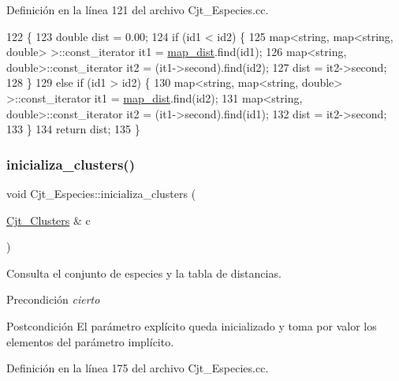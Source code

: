 Definición en la línea 121 del archivo Cjt\+\_\+\+Especies.\+cc.


\begin{DoxyCode}
122 \{
123     \textcolor{keywordtype}{double} dist = 0.00;
124     \textcolor{keywordflow}{if} (id1 < id2) \{
125         map<string, map<string, double> >::const\_iterator it1 = \hyperlink{class_cjt___especies_a9b104014aea0c1472ba4e7d7fc785e9a}{map\_dist}.find(id1);
126         map<string, double>::const\_iterator it2 =  (it1->second).find(id2);
127         dist = it2->second;
128     \}
129     \textcolor{keywordflow}{else} \textcolor{keywordflow}{if} (id1 > id2) \{
130         map<string, map<string, double> >::const\_iterator it1 = \hyperlink{class_cjt___especies_a9b104014aea0c1472ba4e7d7fc785e9a}{map\_dist}.find(id2);
131         map<string, double>::const\_iterator it2 =  (it1->second).find(id1);
132         dist = it2->second;
133     \}
134     \textcolor{keywordflow}{return} dist;
135 \}  
\end{DoxyCode}
\mbox{\label{class_cjt___especies_ae599e4e30a1d77e435395b796f821e06}} 
\subsubsection{\texorpdfstring{inicializa\+\_\+clusters()}{inicializa\_clusters()}}
{\footnotesize\ttfamily void Cjt\+\_\+\+Especies\+::inicializa\+\_\+clusters (\begin{DoxyParamCaption}\item[{\hyperlink{class_cjt___clusters}{Cjt\+\_\+\+Clusters} \&}]{c }\end{DoxyParamCaption})}



Consulta el conjunto de especies y la tabla de distancias. 

\begin{DoxyPrecond}{Precondición}
{\itshape cierto} 
\end{DoxyPrecond}
\begin{DoxyPostcond}{Postcondición}
El parámetro explícito queda inicializado y toma por valor los elementos del parámetro implícito. 
\end{DoxyPostcond}


Definición en la línea 175 del archivo Cjt\+\_\+\+Especies.\+cc.


